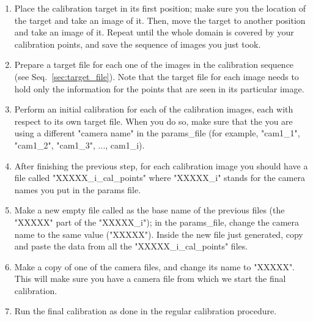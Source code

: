 \documentclass[10pt,a4paper]{article}
\begin{document}
\begin{enumerate}
	\item Place the calibration target in its first position; make sure you the location of the target and take an image of it. Then, move the target to another position and take an image of it. Repeat until the whole domain is covered by your calibration points, and save the sequence of images you just took. 
	
	\item Prepare a target file for each one of the images in the calibration sequence (see Seq.~\ref{sec:target_file}). Note that the target file for each image needs to hold only the information for the points that are seen in its particular image. 
	
	\item Perform an initial calibration for each of the calibration images, each with respect to its own target file. When you do so, make sure that the you are using a different "camera name" in the params\_file (for example, "cam1\_1", "cam1\_2", "cam1\_3", ..., cam1\_i).
	
	\item After finishing the previous step, for each calibration image you should have a file called "XXXXX\_i\_cal\_points" where "XXXXX\_i" stands for the camera names you put in the params file. 
	
	\item Make a new empty file called as the base name of the previous files (the "XXXXX" part of the "XXXXX\_i"); in the params\_file, change the camera name to the same value ("XXXXX"). Inside the new file just generated, copy and paste the data from all the "XXXXX\_i\_cal\_points" files.
	
	\item Make a copy of one of the camera files, and change its name to "XXXXX". This will make sure you have a camera file from which we start the final calibration.
	
	\item Run the final calibration as done in the regular calibration procedure. 
\end{enumerate}


  
\end{document}
